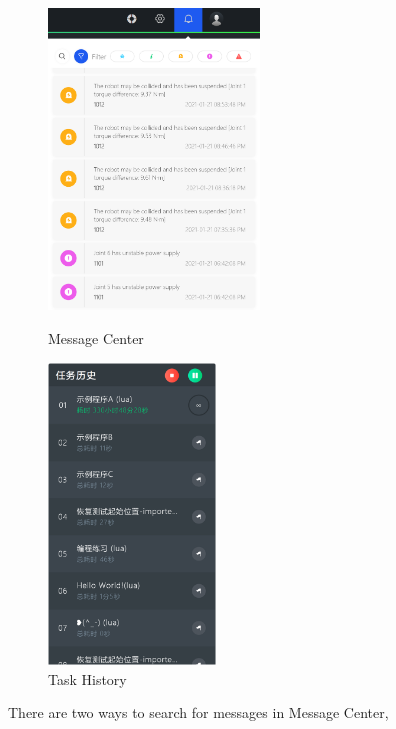 \begin{figure}[htb]
	\centering
	\begin{minipage}[t]{0.55\linewidth}
		\centering
		\includegraphics[height=8cm]{en/image/2-14.png}
		\caption{Message Center}
		\label{fig:消息中心}
	\end{minipage}
	\hfill
	\begin{minipage}[t]{0.4\linewidth}
		\centering
		\includegraphics[height=8cm]{en/image/2-15.png}
		\caption{Task History}
		\label{fig:任务历史}
	\end{minipage}
\end{figure}
There are two ways to search for messages in Message Center,

